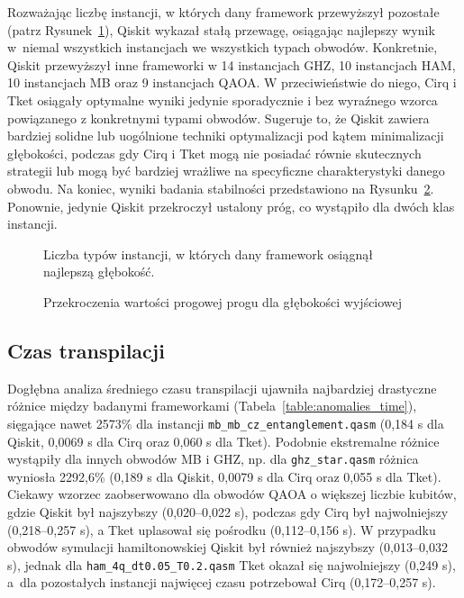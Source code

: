 Rozważając liczbę instancji, w których dany framework przewyższył pozostałe (patrz Rysunek~\ref{fig:heatmap_depth}), Qiskit wykazał stałą przewagę, osiągając najlepszy wynik w~niemal wszystkich instancjach we wszystkich typach obwodów. Konkretnie, Qiskit przewyższył inne frameworki w 14 instancjach GHZ, 10 instancjach HAM, 10 instancjach MB oraz 9 instancjach QAOA.
W przeciwieństwie do niego, Cirq i Tket osiągały optymalne wyniki jedynie sporadycznie i bez wyraźnego wzorca powiązanego z konkretnymi typami obwodów. Sugeruje to, że Qiskit zawiera bardziej solidne lub uogólnione techniki optymalizacji pod kątem minimalizacji głębokości, podczas gdy Cirq i Tket mogą nie posiadać równie skutecznych strategii lub mogą być bardziej wrażliwe na specyficzne charakterystyki danego obwodu.
Na koniec, wyniki badania stabilności przedstawiono na Rysunku~\ref{fig:threshold-exceedances_d}. Ponownie, jedynie Qiskit przekroczył ustalony próg, co wystąpiło dla dwóch klas instancji.

\begin{figure}
  \centering
  
  \caption{Liczba typów instancji, w których dany framework osiągnął najlepszą głębokość.}
  \label{fig:heatmap_depth}
\end{figure}

\begin{figure}
    \centering
    
    \caption{Przekroczenia wartości progowej progu dla głębokości wyjściowej}
    \label{fig:threshold-exceedances_d}
\end{figure}

\subsection{Czas transpilacji}
Dogłębna analiza średniego czasu transpilacji ujawniła najbardziej drastyczne różnice między badanymi frameworkami (Tabela~\ref{table:anomalies_time}), sięgające nawet 2573\% dla instancji \texttt{mb\_mb\_cz\_entanglement.qasm} (0,184 s dla Qiskit, 0,0069 s dla Cirq oraz 0,060 s dla Tket). Podobnie ekstremalne różnice wystąpiły dla innych obwodów MB i GHZ, np. dla \texttt{ghz\_star.qasm} różnica wyniosła 2292,6\% (0,189 s dla Qiskit, 0,0079 s dla Cirq oraz 0,055 s dla Tket).
Ciekawy wzorzec zaobserwowano dla obwodów QAOA o większej liczbie kubitów, gdzie Qiskit był najszybszy (0,020--0,022 s), podczas gdy Cirq był najwolniejszy (0,218--0,257 s), a Tket uplasował się pośrodku (0,112--0,156 s).
W przypadku obwodów symulacji hamiltonowskiej Qiskit był również najszybszy (0,013--0,032 s), jednak dla \texttt{ham\_4q\_dt0.05\_T0.2.qasm} Tket okazał się najwolniejszy (0,249 s), a~dla pozostałych instancji najwięcej czasu potrzebował Cirq (0,172--0,257 s).


